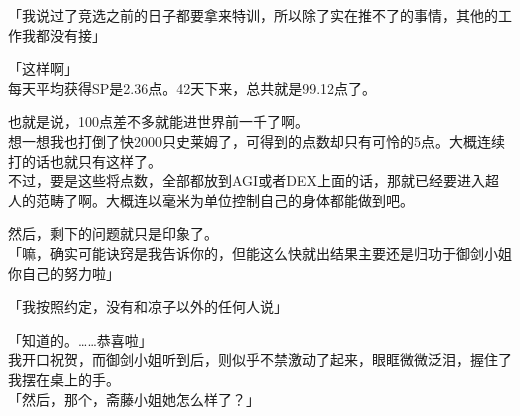 「我说过了竞选之前的日子都要拿来特训，所以除了实在推不了的事情，其他的工作我都没有接」

「这样啊」\\

每天平均获得SP是2.36点。42天下来，总共就是99.12点了。

也就是说，100点差不多就能进世界前一千了啊。\\

想一想我也打倒了快2000只史莱姆了，可得到的点数却只有可怜的5点。大概连续打的话也就只有这样了。\\

不过，要是这些将点数，全部都放到AGI或者DEX上面的话，那就已经要进入超人的范畴了啊。大概连以毫米为单位控制自己的身体都能做到吧。

然后，剩下的问题就只是印象了。\\

「嘛，确实可能诀窍是我告诉你的，但能这么快就出结果主要还是归功于御剑小姐你自己的努力啦」

「我按照约定，没有和凉子以外的任何人说」

「知道的。……恭喜啦」\\

我开口祝贺，而御剑小姐听到后，则似乎不禁激动了起来，眼眶微微泛泪，握住了我摆在桌上的手。\\

「然后，那个，斋藤小姐她怎么样了？」\\

